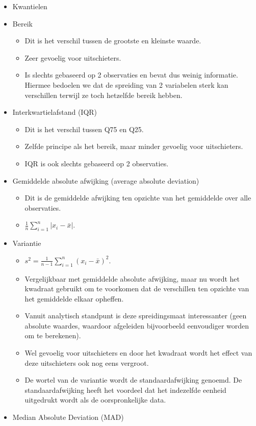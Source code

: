 \documentclass[]{tufte-book}
\providecommand{\tightlist}{%
  \setlength{\itemsep}{0pt}\setlength{\parskip}{0pt}}
\begin{document}
\begin{itemize}
\tightlist
\item
  Kwantielen
\item
  Bereik

  \begin{itemize}
  \tightlist
  \item
    Dit is het verschil tussen de grootste en kleinste waarde.
  \item
    Zeer gevoelig voor uitschieters.
  \item
    Is slechts gebaseerd op 2 observaties en bevat dus weinig informatie. Hiermee bedoelen we dat de spreiding van 2 variabelen sterk kan verschillen terwijl ze toch hetzelfde bereik hebben.
  \end{itemize}
\item
  Interkwartielafstand (IQR)

  \begin{itemize}
  \tightlist
  \item
    Dit is het verschil tussen Q75 en Q25.
  \item
    Zelfde principe als het bereik, maar minder gevoelig voor uitschieters.
  \item
    IQR is ook slechts gebaseerd op 2 observaties.
  \end{itemize}
\item
  Gemiddelde absolute afwijking (average absolute deviation)

  \begin{itemize}
  \tightlist
  \item
    Dit is de gemiddelde afwijking ten opzichte van het gemiddelde over alle observaties.
  \item
    \(\frac{1}{n}\sum_{i=1}^{n}\lvert x_i - \bar{x} \rvert\).
  \end{itemize}
\item
  Variantie

  \begin{itemize}
  \tightlist
  \item
    \(s^2 = \frac{1}{n-1}\sum_{i=1}^{n}(x_i - \bar{x})^2\).
  \item
    Vergelijkbaar met gemiddelde absolute afwijking, maar nu wordt het kwadraat gebruikt om te voorkomen dat de verschillen ten opzichte van het gemiddelde elkaar opheffen.
  \item
    Vanuit analytisch standpunt is deze spreidingsmaat interessanter (geen absolute waardes, waardoor afgeleiden bijvoorbeeld eenvoudiger worden om te berekenen).
  \item
    Wel gevoelig voor uitschieters en door het kwadraat wordt het effect van deze uitschieters ook nog eens vergroot.
  \item
    De wortel van de variantie wordt de standaardafwijking genoemd. De standaardafwijking heeft het voordeel dat het indezelfde eenheid uitgedrukt wordt als de oorspronkelijke data.
  \end{itemize}
\item
  Median Absolute Deviation (MAD)


\end{itemize}
\end{document}
